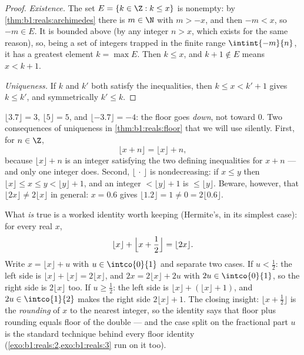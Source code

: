 \begin{proof}
\emph{Existence.} The set $E = \{k \in \Z : k \leq x\}$ is nonempty:
by \cref{thm:b1:reals:archimedes} there is $m \in \N$ with $m > -x$,
and then $-m < x$, so $-m \in E$. It is bounded above (by any integer
$n > x$, which exists for the same reason), so, being a set of
integers trapped in the finite range $\intint{-m}{n}$, it has a
greatest element $k = \max E$. Then $k \leq x$, and $k + 1 \notin E$
means $x < k + 1$.

\emph{Uniqueness.} If $k$ and $k'$ both satisfy the inequalities,
then $k \leq x < k' + 1$ gives $k \leq k'$, and symmetrically $k'
\leq k$.
\end{proof}

\begin{example}\label{ex:b1:reals:floorpractice}
$\lfloor 3.7 \rfloor = 3$, $\lfloor 5 \rfloor = 5$, and $\lfloor
-3.7 \rfloor = -4$: the floor goes \emph{down}, not toward $0$.
Two consequences of uniqueness in \cref{thm:b1:reals:floor} that
we will use silently. First, for $n \in \Z$,
\[
\lfloor x + n \rfloor = \lfloor x \rfloor + n ,
\]
because $\lfloor x \rfloor + n$ is an integer satisfying the two
defining inequalities for $x + n$ --- and only one integer does.
Second, $\lfloor \, \cdot \, \rfloor$ is nondecreasing: if $x \leq
y$ then $\lfloor x \rfloor \leq x \leq y < \lfloor y \rfloor + 1$,
and an integer $< \lfloor y \rfloor + 1$ is $\leq \lfloor y
\rfloor$. Beware, however, that $\lfloor 2x \rfloor \neq 2\lfloor
x \rfloor$ in general: $x = 0.6$ gives $\lfloor 1.2 \rfloor = 1
\neq 0 = 2\lfloor 0.6 \rfloor$.

What \emph{is} true is a worked identity worth keeping (Hermite's,
in its simplest case): for every real $x$,
\[
\lfloor x \rfloor + \Bigl\lfloor x + \frac12 \Bigr\rfloor
= \lfloor 2x \rfloor .
\]
Write $x = \lfloor x\rfloor + u$ with $u \in \intco{0}{1}$ and
separate two cases. If $u < \frac12$: the left side is $\lfloor
x\rfloor + \lfloor x\rfloor = 2\lfloor x\rfloor$, and $2x =
2\lfloor x\rfloor + 2u$ with $2u \in \intco{0}{1}$, so the right
side is $2\lfloor x\rfloor$ too. If $u \geq \frac12$: the left
side is $\lfloor x\rfloor + (\lfloor x\rfloor + 1)$, and $2u \in
\intco{1}{2}$ makes the right side $2\lfloor x\rfloor + 1$. The
closing insight: $\lfloor x + \frac12\rfloor$ is the
\emph{rounding} of $x$ to the nearest integer, so the identity
says that floor plus rounding equals floor of the double --- and
the case split on the fractional part $u$ is the standard
technique behind every floor identity
(\cref{exo:b1:reals:2,exo:b1:reals:3} run on it too).
\end{example}

